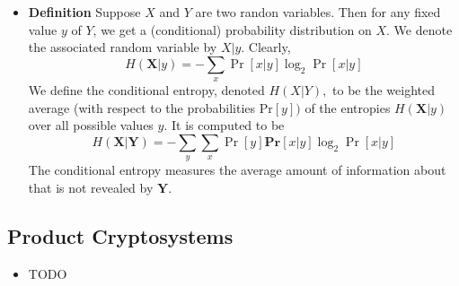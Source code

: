 \message{ !name(crypto-noter.tex)}\documentclass[a4, english]{article}
\begin{document}
\begin{itemize}
  \item \textbf{Definition} Suppose $X$ and $Y$ are two randon variables. Then for any fixed value $y$ of $Y$, we get a (conditional) probability distribution on $X$. We denote the associated random variable by $X | y .$ Clearly,
  $$
    H(\mathbf{X} | y)=-\sum_{x} \operatorname{Pr}[x | y] \log _{2} \operatorname{Pr}[x | y]
  $$
  We define the conditional entropy, denoted $H(X | Y),$ to be the weighted average (with respect to the probabilities $\text{Pr}[y])$ of the entropies $H(\mathbf{X} | y)$ over all possible values $y .$ It is computed to be
  $$
    H (\mathbf{X} | \mathbf{Y})=-\sum_{y} \sum_{x} \operatorname{Pr}[y] \mathbf{P r}[x | y] \log _{2} \operatorname{Pr}[x | y]
  $$
  The conditional entropy measures the average amount of information about
that is not revealed by $\mathbf{Y} .$
\end{itemize}

\subsection{Product Cryptosystems}
\begin{itemize}
	\item TODO
\end{itemize}

\newpage 


\end{document}
